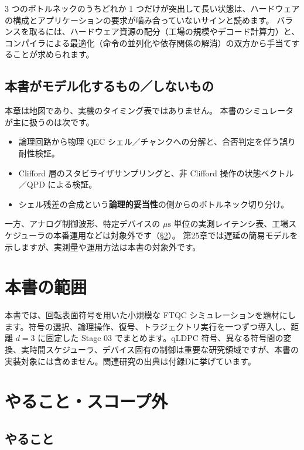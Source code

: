 \begin{notebox}
  3 つのボトルネックのうちどれか 1 つだけが突出して長い状態は、ハードウェアの構成とアプリケーションの要求が噛み合っていないサインと読めます。
  バランスを取るには、ハードウェア資源の配分（工場の規模やデコード計算力）と、コンパイラによる最適化（命令の並列化や依存関係の解消）の双方から手当てすることが求められます。
\end{notebox}

\subsection{本書がモデル化するもの／しないもの}

本章は地図であり、実機のタイミング表ではありません。
本書のシミュレータが主に扱うのは次です。

\begin{itemize}
  \item 論理回路から物理 QEC シェル／チャンクへの分解と、合否判定を伴う誤り耐性検証。
  \item Clifford 層のスタビライザサンプリングと、非 Clifford 操作の状態ベクトル／QPD による検証。
  \item シェル残差の合成という\textbf{論理的妥当性}の側からのボトルネック切り分け。
\end{itemize}

一方、アナログ制御波形、特定デバイスの $\mu\mathrm{s}$ 単位の実測レイテンシ表、工場スケジューラの本番運用などは対象外です（§\ref{sec:ftqc_scope}）。
第25章では遅延の簡易モデルを示しますが、実測量や運用方法は本書の対象外です。

\section{本書の範囲}\label{sec:book_scope}

本書では、回転表面符号を用いた小規模な FTQC シミュレーションを題材にします。符号の選択、論理操作、復号、トラジェクトリ実行を一つずつ導入し、距離 $d=3$ に固定した Stage 03 でまとめます。qLDPC 符号、異なる符号間の変換、実時間スケジューラ、デバイス固有の制御は重要な研究領域ですが、本書の実装対象には含めません。関連研究の出典は付録Dに挙げています。


\section{やること・スコープ外}\label{sec:ftqc_scope}

\subsection{やること}

